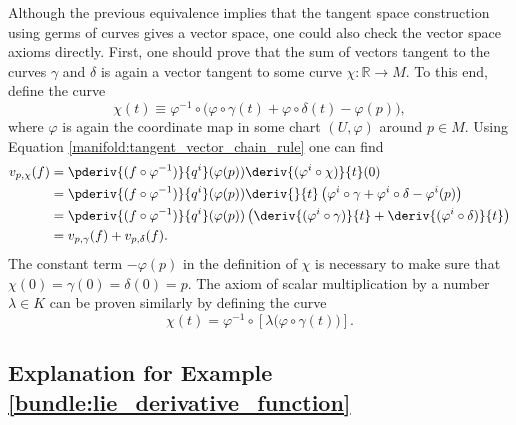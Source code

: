     Although the previous equivalence implies that the tangent space construction using germs of curves gives a vector space, one could also check the vector space axioms directly. First, one should prove that the sum of vectors tangent to the curves $\gamma$ and $\delta$ is again a vector tangent to some curve $\chi:\mathbb{R}\rightarrow M$. To this end, define the curve \[\chi(t)\equiv\varphi^{-1}\circ\Big(\varphi\circ\gamma(t) + \varphi\circ\delta(t) - \varphi(p)\Big),\] where $\varphi$ is again the coordinate map in some chart $(U,\varphi)$ around $p\in M$. Using Equation \eqref{manifold:tangent_vector_chain_rule} one can find
    \begin{align*}
        v_{p,\chi}(f) &= \pderiv{(f\circ\varphi^{-1})}{q^i}(\varphi(p))\deriv{(\varphi^i\circ\chi)}{t}(0)\\
        &=\pderiv{(f\circ\varphi^{-1})}{q^i}(\varphi(p))\deriv{}{t}\left(\varphi^i\circ\gamma + \varphi^i\circ\delta - \varphi^i(p)\right)\\
        &=\pderiv{(f\circ\varphi^{-1})}{q^i}(\varphi(p))\left(\deriv{(\varphi^i\circ\gamma)}{t} + \deriv{(\varphi^i\circ\delta)}{t}\right)\\
        &=v_{p,\gamma}(f) + v_{p,\delta}(f).
    \end{align*}
    The constant term $-\varphi(p)$ in the definition of $\chi$ is necessary to make sure that $\chi(0) = \gamma(0) = \delta(0) = p$. The axiom of scalar multiplication by a number $\lambda\in K$ can be proven similarly by defining the curve \[\chi(t) = \varphi^{-1}\circ\left[\lambda\Big(\varphi\circ\gamma(t)\Big)\right].\]

\subsection{Explanation for Example \ref{bundle:lie_derivative_function}}

